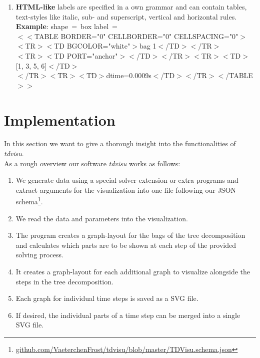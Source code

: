 \documentclass[a4paper, 12pt, bibliography=totoc]{scrartcl}
\begin{document}
\begin{itemize}
\begin{enumerate}[label=(\arabic*)]
		\item \textbf{HTML-like} labels are specified in a own grammar and can contain tables, text-styles like italic, sub- and superscript, vertical and horizontal rules.\vspace{10pt}\\		
		\textbf{Example}: shape~=~box label~=\vspace{5pt}\\
		$<<$TABLE BORDER="0" CELLBORDER="0" CELLSPACING="0"$>$\\
		$<$TR$><$TD BGCOLOR="white"$>$bag 1$<$/TD$><$/TR$>$\\
		$<$TR$><$TD PORT="anchor"$>$$<$/TD$><$/TR$><$TR$><$TD$>$[1, 3, 5, 6]$<$/TD$>$\\ $<$/TR$><$TR$><$TD$>$dtime=0.0009s$<$/TD$><$/TR$><$/TABLE$>>$
	\end{enumerate}
\end{itemize}


\newpage
\section{Implementation}\label{sec:project}

In this section we want to give a thorough insight into the functionalities of \textit{tdvisu}.\\

\noindent As a rough overview our software \textit{tdvisu} works as follows:

\begin{enumerate}
	\item We generate data using a special solver extension or extra programs and extract arguments for the visualization into one file following our JSON schema\footnote{\url{github.com/VaeterchenFrost/tdvisu/blob/master/TDVisu.schema.json}}.
	\item We read the data and parameters into the visualization.
	\item The program creates a graph-layout for the bags of the tree decomposition and calculates which parts are to be shown at each step of the provided solving process.
	\item It creates a graph-layout for each additional graph to visualize alongside the steps in the tree decomposition.
	\item Each graph for individual time steps is saved as a SVG file.
	\item If desired, the individual parts of a time step can be merged into a single SVG file.
\end{enumerate}
\end{document}
